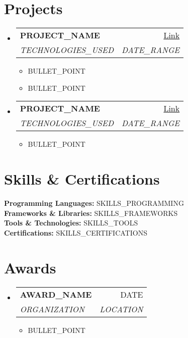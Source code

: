 \documentclass[letterpaper,11pt]{article}
\makeatletter
\newcommand{\resumeItem}[1]{
  \item\small{#1}
}
\newcommand{\resumeSubheading}[4]{
  \vspace{1pt}
  \item
    \begin{tabular*}{0.97\textwidth}[t]{l@{\extracolsep{\fill}}r}
      \textbf{#1} & #2 \\
      \textit{#3} & \textit{#4} \\
    \end{tabular*}\vspace{1pt}
}
\newcommand{\skillCategory}[2]{
  \textbf{#1:} #2\\[2pt]
}
\makeatother
\begin{document}
\section{Projects}
\begin{itemize}[leftmargin=0.15in, label={}]
    \resumeSubheading
      {PROJECT\_NAME}{\href{PROJECT\_LINK}{Link}}
      {TECHNOLOGIES\_USED}{DATE\_RANGE}
      \begin{itemize}[leftmargin=0.15in, label=\textbullet]
        \resumeItem{BULLET\_POINT}
        \resumeItem{BULLET\_POINT}
      \end{itemize}
    
    \resumeSubheading
      {PROJECT\_NAME}{\href{PROJECT\_LINK}{Link}}
      {TECHNOLOGIES\_USED}{DATE\_RANGE}
      \begin{itemize}[leftmargin=0.15in, label=\textbullet]
        \resumeItem{BULLET\_POINT}
      \end{itemize}
\end{itemize}

\section{Skills \& Certifications}
\skillCategory{Programming Languages}{SKILLS\_PROGRAMMING}
\skillCategory{Frameworks \& Libraries}{SKILLS\_FRAMEWORKS}
\skillCategory{Tools \& Technologies}{SKILLS\_TOOLS}
\skillCategory{Certifications}{SKILLS\_CERTIFICATIONS}

\section{Awards}
\begin{itemize}[leftmargin=0.15in, label={}]
    \resumeSubheading
      {AWARD\_NAME}{DATE}
      {ORGANIZATION}{LOCATION}
      \begin{itemize}[leftmargin=0.15in, label=\textbullet]
        \resumeItem{BULLET\_POINT}
      \end{itemize}
\end{itemize}
\end{document}
